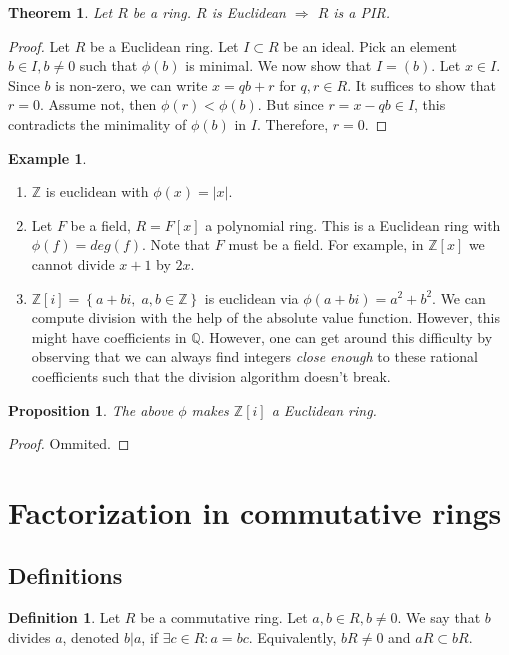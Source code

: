 \documentclass{article}
\newcommand\Z{\ensuremath{\mathbb{Z}}}
\newcommand\Q{\ensuremath{\mathbb{Q}}}
\newtheorem{theorem}{Theorem}[section]
\theoremstyle{definition}
\newtheorem{definition}{Definition}[subsection]
\newtheorem{eg}{Example}[subsection]
\theoremstyle{remark}
\theoremstyle{plain}
\newtheorem{prop}{Proposition}[subsection]
\begin{document}
\begin{theorem}
    Let \(R\) be a ring. \(R\) is Euclidean \(\Rightarrow\) \(R\) is a PIR. 
\end{theorem}
\begin{proof}
    Let \(R\) be a Euclidean ring. Let \(I \subset R\) be an ideal. 
    Pick an element \(b \in I, b\neq 0\) such that \(\phi(b)\) is minimal. 
    We now show that \(I = (b)\). Let \(x \in I\). Since \(b\) is non-zero, we can write \(x = qb + r\) for \(q,r\in R\).
    It suffices to show that \(r = 0\). Assume not, then \(\phi(r) < \phi(b)\). But since \(r = x - qb \in I\), 
    this contradicts the minimality of \(\phi(b)\) in \(I\). Therefore, \(r = 0\).
\end{proof}

\begin{eg}
    \begin{enumerate}
        \item \(\Z\) is euclidean with \(\phi(x) = |x|\).
        \item Let \(F\) be a field, \(R = F[x]\) a polynomial ring. This is a Euclidean ring with \(\phi(f) = deg(f)\). Note that \(F\) must be a field. For example, in \(\Z[x]\) we cannot divide 
        \(x+1\) by \(2x\).
        \item \(\Z[i] = \left\{ a + bi,\; a,b \in \Z \right\}\) is euclidean via \(\phi(a+bi) = a^2 + b^2\). We can compute division with the help of the absolute value function. However, this might have coefficients in \(\Q\).
        However, one can get around this difficulty by observing that we can always find integers \textit{close enough} to these rational coefficients such that the division algorithm doesn't break. 
    \end{enumerate}
\end{eg}

\begin{prop}
    The above \(\phi\) makes \(\Z[i]\) a Euclidean ring.
\end{prop}
\begin{proof}
    Ommited.
\end{proof}

\section{Factorization in commutative rings}
\subsection{Definitions}
\begin{definition}
    Let \(R\) be a commutative ring. Let \(a,b \in R, b\neq 0\). We say that \(b\)
    divides \(a\), denoted \(b|a\), if \(\exists c\in R: a = bc\). Equivalently, \(bR\neq 0\) and \(aR \subset bR\).
\end{definition}
\end{document}
